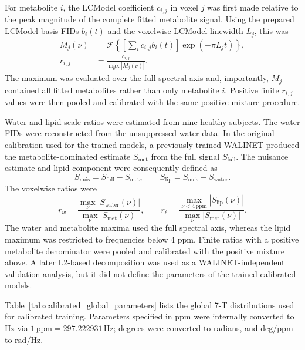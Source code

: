For metabolite $i$, the LCModel coefficient $c_{i,j}$ in voxel $j$ was first
made relative to the peak magnitude of the complete fitted metabolite signal.
Using the prepared LCModel basis FIDs $b_i(t)$ and the voxelwise LCModel
linewidth $L_j$, this was
\begin{align}
    M_j(\nu) &= \mathcal{F}\!\left\{
        \left[\sum_i c_{i,j}b_i(t)\right]
        \exp(-\pi L_j t)
    \right\},\\
    r_{i,j} &= \frac{c_{i,j}}{\max_{\nu}|M_j(\nu)|}.
\end{align}
The maximum was evaluated over the full spectral axis and, importantly,
$M_j$ contained all fitted metabolites rather than only metabolite $i$.
Positive finite $r_{i,j}$ values were then pooled and calibrated with the same
positive-mixture procedure.

Water and lipid scale ratios were estimated from nine healthy subjects.  The
water FIDs were reconstructed from the unsuppressed-water data.  In the
original calibration used for the trained models, a previously trained
WALINET produced the metabolite-dominated estimate $S_{\mathrm{met}}$ from the
full signal $S_{\mathrm{full}}$.  The nuisance estimate and lipid component
were consequently defined as
\begin{equation}
    S_{\mathrm{nuis}}=S_{\mathrm{full}}-S_{\mathrm{met}},\qquad
    S_{\mathrm{lip}}=S_{\mathrm{nuis}}-S_{\mathrm{water}}.
\end{equation}
The voxelwise ratios were
\begin{equation}
    r_w=\frac{\max_{\nu}|S_{\mathrm{water}}(\nu)|}
              {\max_{\nu}|S_{\mathrm{met}}(\nu)|},\qquad
    r_\ell=\frac{\max_{\nu<4\,\mathrm{ppm}}|S_{\mathrm{lip}}(\nu)|}
                 {\max_{\nu}|S_{\mathrm{met}}(\nu)|}.
\end{equation}
The water and metabolite maxima used the full spectral axis, whereas the lipid
maximum was restricted to frequencies below $4$ ppm.  Finite ratios with a
positive metabolite denominator were pooled and calibrated with the positive
mixture above.  A later L2-based decomposition was used as a WALINET-independent
validation analysis, but it did not define the parameters of the trained
calibrated models.

Table~\ref{tab:calibrated_global_parameters} lists the global 7-T distributions
used for calibrated training.  Parameters specified in ppm were internally
converted to Hz via $1\,\mathrm{ppm}=297.222931\,\mathrm{Hz}$; degrees were
converted to radians, and $\mathrm{deg/ppm}$ to $\mathrm{rad/Hz}$.

